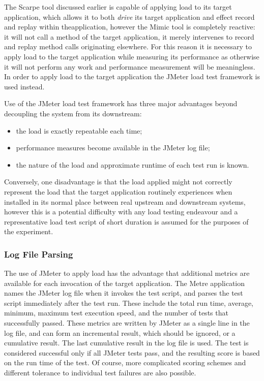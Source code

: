 \documentclass[]{final_report}
\begin{document}
The Scarpe tool discussed earlier is capable of applying load to its target application, which allows it to both \textit{drive} its target application and effect record and replay within the\linebreak[4]application\cite{joshi:2007}, however the Mimic tool is completely reactive: it will not call a method of the target application, it merely intervenes to record and replay method calls originating elsewhere. For this reason it is necessary to apply load to the target application while measuring its performance as otherwise it will not perform any work and performance measurement will be meaningless. In order to apply load to the target application the JMeter load test framework is used instead.

Use of the JMeter load test framework has three major advantages beyond decoupling the system from its downstream:

\begin{itemize}
\item the load is exactly repeatable each time;
\item performance measures become available in the JMeter log file;
\item the nature of the load and approximate runtime of each test run is known.
\end{itemize}

Conversely, one disadvantage is that the load applied might not correctly represent the load that the target application routinely experiences when installed in its normal place between real upstream and downstream systems, however this is a potential difficulty with any load testing endeavour and a representative load test script of short duration is assumed for the purposes of the experiment. 

\subsubsection{Log File Parsing}

The use of JMeter to apply load has the advantage that additional metrics are available for each invocation of the target application. The Metre application names the JMeter log file when it invokes the test script, and parses the test script immediately after the test run. These include the total run time, average, minimum, maximum test execution speed, and the number of tests that successfully passed. These metrics are written by JMeter as a single line in the log file, and can form an incremental result, which should be ignored, or a cumulative result. The last cumulative result in the log file is used. The test is considered successful only if all JMeter tests pass, and the resulting score is based on the run time of the test. Of course, more complicated scoring schemes and different tolerance to individual test failures are also possible.
\end{document}
